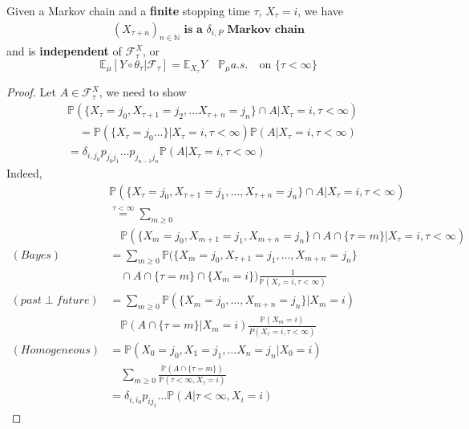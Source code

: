  
\begin{theorem}
	Given a Markov chain and a \textbf{finite} stopping time $\tau$, $X_\tau = i$, we have
	\begin{align*}
		(X_{\tau + n})_{n \in \mathbb{N}} \textbf{ is a $\delta_{i, P}$ Markov chain}
	\end{align*}
	and is \textbf{independent} of $\mathcal{F}^X_\tau$, or
 	\begin{equation*}
 		\mathbb{E}_\mu [Y \circ \theta_\tau|\mathcal{F}_\tau] = \mathbb{E}_{X_\tau} Y \quad \mathbb{P}_\mu a.s. \quad \text{on } \{\tau < \infty\}
 	\end{equation*}
\end{theorem}
	\begin{proof}
		Let $A \in \mathcal{F}^X_\tau$, we need to show 
	\begin{align*}
		&\mathbb{P}(\{X_\tau = j_0, X_{\tau + 1} = j_2, \dots  X_{\tau + n} = j_n\} \cap A| X_\tau = i, \tau < \infty )\\
		&\quad = \mathbb{P}(\{ X_\tau = j_0 \dots \}|X_\tau = i, \tau < \infty)
		\mathbb{P}(A|X_\tau = i, \tau < \infty)\\
		&= \delta_{i, j_0}p_{j_0j_1} \dots p_{j_{n-1}j_n} \mathbb{P}(A |X_\tau = i, \tau < \infty)
	\end{align*}
	Indeed, 
	\begin{align*}
		&\mathbb{P}(\{X_\tau = j_0, X_{\tau + 1} = j_1,\dots, X_{\tau + n} = j_n\} \cap A| X_\tau = i, \tau < \infty )	\\
		&\overset{\tau < \infty} = \sum_{m \ge 0}\\
		&\quad \mathbb{P}(\{X_m = j_0, X_{m + 1} = j_1, X_{m + n} = j_n\} \cap A \cap  \{\tau = m\}| X_\tau = i, \tau < \infty )\\
		(Bayes) &= \sum_{m \geq 0}
		\mathbb{P}(\{ X_m = j_0, X_{\tau + 1} = j_1, \dots, X_{m + n} = j_n\}\\
		&\quad \cap A \cap\{\tau = m\} \cap  \{X_m = i\} )
		\frac{1}{\mathbb{P}(X_\tau = i, \tau < \infty)} \\
		(past\perp future) 
		&= \sum_{m \geq 0}
		\mathbb{P}(\{X_m = j_0,\dots, X_{m + n} = j_n\}| X_m = i)\\
		&\quad
		\mathbb{P}(A \cap \{\tau = m\}|X_m = i)
		\frac{\mathbb{P}(X_m = i)}{P(X_\tau = i, \tau < \infty)} \\
		(Homogeneous)&= \mathbb{P}(X_0 = j_0, X_1 = j_1, \dots X_n = j_n|X_0 = i)\\
		&\quad
		\sum_{ m \geq 0}\frac{\mathbb{P}(A \cap \{\tau = m\})}{\mathbb{P}(\tau < \infty, X_\tau = i)}\\
		&= \delta_{i, i_0} p_{i j_1} \dots \mathbb{P}(A | \tau < \infty, X_i = i)
	\end{align*}
\end{proof}


